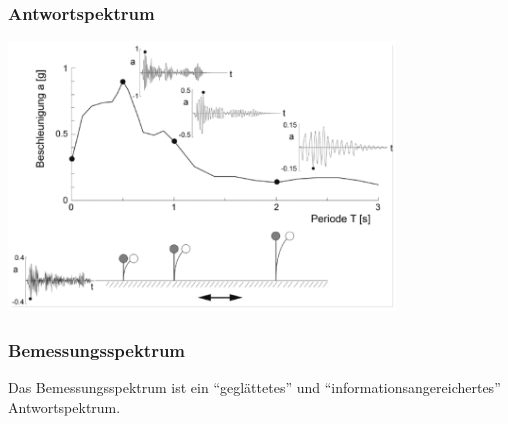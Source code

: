 \begin{frame}
\frametitle{Antwortspektrum}  %
\includegraphics[width=0.77\textwidth]{fig_img/antwortspektrum} %
\end{frame}


\begin{frame}
\frametitle{Bemessungsspektrum}  %

Das Bemessungsspektrum ist ein ``geglättetes'' und ``informationsangereichertes'' Antwortspektrum. 
\end{frame}


